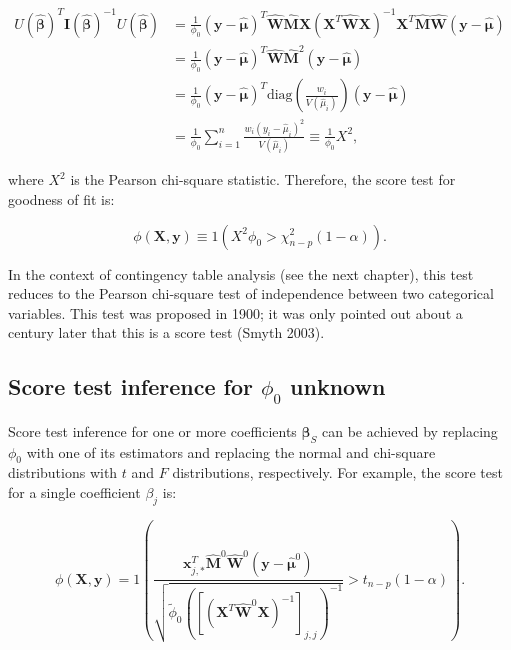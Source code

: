 \documentclass[
  11pt,
  letterpaper,
  oneside]{book}
\theoremstyle{plain}
\theoremstyle{plain}
\theoremstyle{definition}
\theoremstyle{definition}
\theoremstyle{plain}
\theoremstyle{remark}
\begin{document}
\[
\begin{split}
U(\boldsymbol{\widehat{\beta}})^T \boldsymbol{I}(\boldsymbol{\widehat{\beta}})^{-1} U(\boldsymbol{\widehat{\beta}}) &= \frac{1}{\phi_0}(\boldsymbol{y} - \boldsymbol{\widehat{\mu}})^T \boldsymbol{\widehat{W}} \boldsymbol{\widehat{M}} \boldsymbol{X} (\boldsymbol{X}^T \boldsymbol{\widehat{W}} \boldsymbol{X})^{-1} \boldsymbol{X}^T \boldsymbol{\widehat{M}} \boldsymbol{\widehat{W}} (\boldsymbol{y} - \boldsymbol{\widehat{\mu}}) \\
&= \frac{1}{\phi_0}(\boldsymbol{y} - \boldsymbol{\widehat{\mu}})^T \boldsymbol{\widehat{W}} \boldsymbol{\widehat{M}}^2 (\boldsymbol{y} - \boldsymbol{\widehat{\mu}}) \\
&= \frac{1}{\phi_0}(\boldsymbol{y} - \boldsymbol{\widehat{\mu}})^T \text{diag}\left( \frac{w_i}{V(\widehat{\mu}_i)} \right) (\boldsymbol{y} - \boldsymbol{\widehat{\mu}}) \\
&= \frac{1}{\phi_0}\sum_{i=1}^n \frac{w_i (y_i - \widehat{\mu}_i)^2}{V(\widehat{\mu}_i)} \equiv \frac{1}{\phi_0} X^2,
\end{split}
\]

where \(X^2\) is the Pearson chi-square statistic. Therefore, the score
test for goodness of fit is:

\[
\phi(\boldsymbol{X}, \boldsymbol{y}) \equiv 1\left(X^2 \phi_0 > \chi^2_{n-p}(1-\alpha)\right).
\]

In the context of contingency table analysis (see the next chapter),
this test reduces to the Pearson chi-square test of independence between
two categorical variables. This test was proposed in 1900; it was only
pointed out about a century later that this is a score test (Smyth
2003).

\hypertarget{sec-score-test-unknown-dispersion}{%
\subsection{\texorpdfstring{Score test inference for \(\phi_0\)
unknown}{Score test inference for \textbackslash phi\_0 unknown}}\label{sec-score-test-unknown-dispersion}}

Score test inference for one or more coefficients
\(\boldsymbol{\beta}_S\) can be achieved by replacing \(\phi_0\) with
one of its estimators and replacing the normal and chi-square
distributions with \(t\) and \(F\) distributions, respectively. For
example, the score test for a single coefficient \(\beta_j\) is:

\[
\phi(\boldsymbol{X}, \boldsymbol{y}) = 1\left(\frac{\boldsymbol{x}_{j,*}^T \boldsymbol{\widehat{M}}^0 \boldsymbol{\widehat{W}}^0 (\boldsymbol{y} - \boldsymbol{\widehat{\mu}}^0)}{\sqrt{\widetilde{\phi}_0 ([(\boldsymbol{X}^T \boldsymbol{\widehat{W}}^0 \boldsymbol{X})^{-1}]_{j, j})^{-1}}} > t_{n-p}(1-\alpha)\right).
\]
\end{document}
